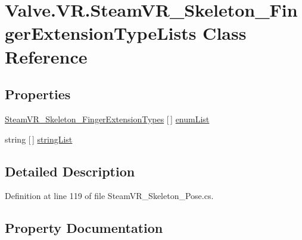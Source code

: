 \hypertarget{class_valve_1_1_v_r_1_1_steam_v_r___skeleton___finger_extension_type_lists}{}\section{Valve.\+V\+R.\+Steam\+V\+R\+\_\+\+Skeleton\+\_\+\+Finger\+Extension\+Type\+Lists Class Reference}
\label{class_valve_1_1_v_r_1_1_steam_v_r___skeleton___finger_extension_type_lists}
\subsection*{Properties}
\begin{DoxyCompactItemize}
\item 
\mbox{\hyperlink{namespace_valve_1_1_v_r_af4f7ce87893374f71b2fa2ba112642da}{Steam\+V\+R\+\_\+\+Skeleton\+\_\+\+Finger\+Extension\+Types}} \mbox{[}$\,$\mbox{]} \mbox{\hyperlink{class_valve_1_1_v_r_1_1_steam_v_r___skeleton___finger_extension_type_lists_a34e7c04c2105965097e369637e3c4292}{enum\+List}}
\item 
string \mbox{[}$\,$\mbox{]} \mbox{\hyperlink{class_valve_1_1_v_r_1_1_steam_v_r___skeleton___finger_extension_type_lists_ac8e933578ee155d66997fd6c01ae969b}{string\+List}}
\end{DoxyCompactItemize}


\subsection{Detailed Description}


Definition at line 119 of file Steam\+V\+R\+\_\+\+Skeleton\+\_\+\+Pose.\+cs.



\subsection{Property Documentation}
\mbox{\label{class_valve_1_1_v_r_1_1_steam_v_r___skeleton___finger_extension_type_lists_a34e7c04c2105965097e369637e3c4292}} 
